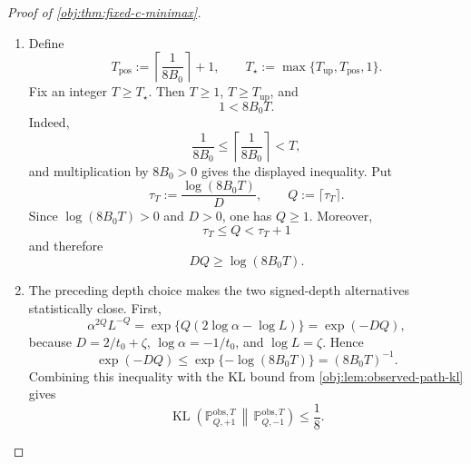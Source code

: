 \documentclass[11pt]{article}
\begin{document}
\begin{proof}[Proof of \cref{obj:thm:fixed-c-minimax}]
\begin{enumerate}
\item Define
\[
T_{\mathrm{pos}}:=\left\lceil\frac{1}{8B_0}\right\rceil+1,
\qquad
T_\star:=\max\{T_{\mathrm{up}},T_{\mathrm{pos}},1\}.
\]
Fix an integer \(T\ge T_\star\). Then \(T\ge1\), \(T\ge T_{\mathrm{up}}\), and
\[
1<8B_0T .
\]
Indeed,
\[
\frac{1}{8B_0}
\le
\left\lceil\frac{1}{8B_0}\right\rceil
<
T,
\]
and multiplication by \(8B_0>0\) gives the displayed inequality. Put
\[
\tau_T:=\frac{\log(8B_0T)}{D},
\qquad
Q:=\lceil \tau_T\rceil .
\]
Since \(\log(8B_0T)>0\) and \(D>0\), one has \(Q\ge1\). Moreover,
\[
\tau_T\le Q<\tau_T+1
\]
and therefore
\[
DQ\ge \log(8B_0T).
\] %

\item The preceding depth choice makes the two signed-depth alternatives statistically close. First,
\[
\alpha^{2Q}L^{-Q}
=
\exp\{Q(2\log\alpha-\log L)\}
=
\exp(-DQ),
\]
because \(D=2/t_0+\zeta\), \(\log\alpha=-1/t_0\), and \(\log L=\zeta\). Hence
\[
\exp(-DQ)
\le
\exp\{-\log(8B_0T)\}
=
(8B_0T)^{-1}.
\]
Combining this inequality with the KL bound from \cref{obj:lem:observed-path-kl} gives
\[
\operatorname{KL}\!\left(
\mathbb P_{Q,+1}^{\mathrm{obs},T}
\,\middle\|\,
\mathbb P_{Q,-1}^{\mathrm{obs},T}
\right)
\le
\frac18 .
\] %


\end{enumerate}
\end{proof}
\end{document}
